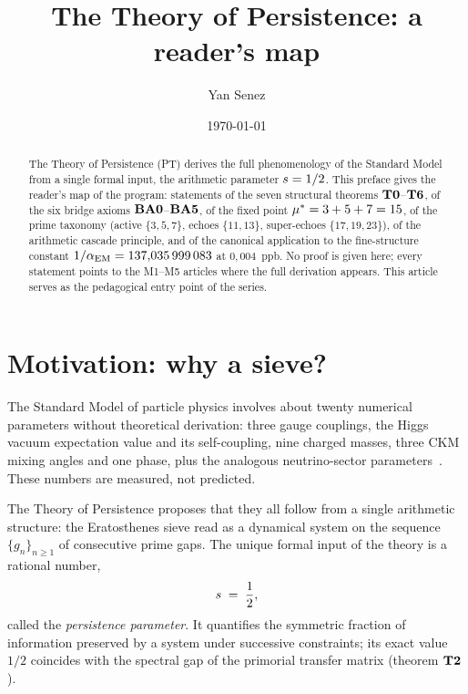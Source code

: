 

\title{The Theory of Persistence: a reader's map}
\author{Yan Senez}
\date{\today}



\maketitle

\begin{abstract}
\noindent
The Theory of Persistence (PT) derives the full phenomenology of the Standard Model from a single formal input, the arithmetic parameter $s = 1/2$. This preface gives the reader's map of the program: statements of the seven structural theorems $\textbf{T0}$--$\textbf{T6}$, of the six bridge axioms $\textbf{BA0}$--$\textbf{BA5}$, of the fixed point $\mu^{*} = 3 + 5 + 7 = 15$, of the prime taxonomy (active $\{3,5,7\}$, echoes $\{11,13\}$, super-echoes $\{17,19,23\}$), of the arithmetic cascade principle, and of the canonical application to the fine-structure constant $1/\alpha_{\rm EM} = 137{,}035\,999\,083$ at $0{,}004$~ppb. No proof is given here; every statement points to the M1--M5 articles where the full derivation appears. This article serves as the pedagogical entry point of the series.
\end{abstract}

\tableofcontents

\section{Motivation: why a sieve?}
\label{sec:motivation}

The Standard Model of particle physics involves about twenty numerical parameters without theoretical derivation: three gauge couplings, the Higgs vacuum expectation value and its self-coupling, nine charged masses, three CKM mixing angles and one phase, plus the analogous neutrino-sector parameters~\cite{PDG2024}. These numbers are measured, not predicted.

The Theory of Persistence proposes that they all follow from a single arithmetic structure: the Eratosthenes sieve read as a dynamical system on the sequence $\{g_n\}_{n \geq 1}$ of consecutive prime gaps. The unique formal input of the theory is a rational number,
\[
s \;=\; \dfrac{1}{2},
\]
called the \emph{persistence parameter}. It quantifies the symmetric fraction of information preserved by a system under successive constraints; its exact value $1/2$ coincides with the spectral gap of the primorial transfer matrix (theorem $\textbf{T2}$).

